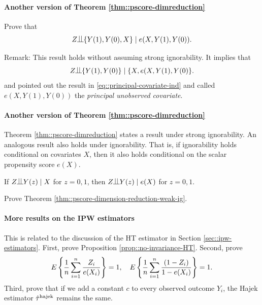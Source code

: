  
 
 
 \paragraph{Another version of Theorem \ref{thm::pscore-dimreduction}} \label{hw::principal-unobserved-cov}
 Prove that 
\begin{equation}
\label{eq::principal-covariate-ind}
 Z\ind \{  Y(1), Y(0) , X\}  \mid e(X, Y(1), Y(0)   ) .
\end{equation}  
 
 Remark:
 This result holds without assuming strong ignorability. It implies that
 $$
  Z\ind \{  Y(1), Y(0) \}  \mid  \{ X,   e(X, Y(1), Y(0)  \} .
 $$
\citet{rosenbaum2020modern} and \citet{rosenbaum2023propensity} pointed out the result in \eqref{eq::principal-covariate-ind} and called $e(X, Y(1), Y(0)   ) $ the  {\it  principal unobserved covariate}. 
 
 
 
\paragraph{Another version of Theorem \ref{thm::pscore-dimreduction}} 

Theorem \ref{thm::pscore-dimreduction} states a result under strong ignorability. An analogous result also holds under ignorability. 
That is, if ignorability holds conditional on covariates $X$, then it also holds conditional on the scalar propensity score $e(X)$. 

\begin{theorem}
\label{thm::pscore-dimension-reduction-weak-ig}
If $Z\ind Y(z)  \mid X$ for $z=0,1$, then
$
Z\ind Y(z)\mid e(X)
$
for $z=0,1$. 
\end{theorem} 


Prove Theorem \ref{thm::pscore-dimension-reduction-weak-ig}.



 
 \paragraph{More results on the IPW estimators}
\label{hw::hajek-weights} 
 
This is related to the discussion of the HT estimator in Section \ref{sec::ipw-estimators}. First, prove Proposition \ref{prop::no-invariance-HT}.  
Second, prove 
 \begin{eqnarray*} 
E\left\{ \frac{1}{n} \sum_{i=1}^n \frac{Z_i }{e(X_i) } \right\} =1,\quad
E\left\{  \frac{1}{n} \sum_{i=1}^n \frac{ (1-Z_i) }{ 1 - e(X_i) }  \right\} = 1.
\end{eqnarray*}
Third, prove that if we add a constant $c$ to every observed outcome $Y_i$, the Hajek estimator
$
\hat{\tau}^\textup{hajek} 
$
remains the same. 



